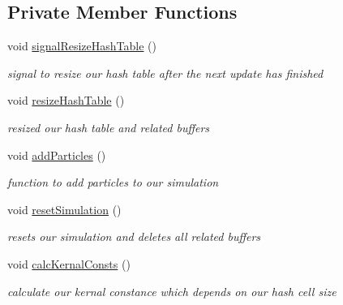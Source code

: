 \subsection*{Private Member Functions}
\begin{DoxyCompactItemize}
\item 
\hypertarget{class_s_p_h_engine_aee1d2a0c0bbc334c35924bc0a8ad8052}{void \hyperlink{class_s_p_h_engine_aee1d2a0c0bbc334c35924bc0a8ad8052}{signal\-Resize\-Hash\-Table} ()}\label{class_s_p_h_engine_aee1d2a0c0bbc334c35924bc0a8ad8052}

\begin{DoxyCompactList}\small\item\em signal to resize our hash table after the next update has finished \end{DoxyCompactList}\item 
\hypertarget{class_s_p_h_engine_a3626e4be502cdce3eb88bcdbf5adb2f6}{void \hyperlink{class_s_p_h_engine_a3626e4be502cdce3eb88bcdbf5adb2f6}{resize\-Hash\-Table} ()}\label{class_s_p_h_engine_a3626e4be502cdce3eb88bcdbf5adb2f6}

\begin{DoxyCompactList}\small\item\em resized our hash table and related buffers \end{DoxyCompactList}\item 
\hypertarget{class_s_p_h_engine_a8d1f44ed34bc68b564f7e5c730288d44}{void \hyperlink{class_s_p_h_engine_a8d1f44ed34bc68b564f7e5c730288d44}{add\-Particles} ()}\label{class_s_p_h_engine_a8d1f44ed34bc68b564f7e5c730288d44}

\begin{DoxyCompactList}\small\item\em function to add particles to our simulation \end{DoxyCompactList}\item 
\hypertarget{class_s_p_h_engine_a5e5a0bc3c47805756cd697a16076800d}{void \hyperlink{class_s_p_h_engine_a5e5a0bc3c47805756cd697a16076800d}{reset\-Simulation} ()}\label{class_s_p_h_engine_a5e5a0bc3c47805756cd697a16076800d}

\begin{DoxyCompactList}\small\item\em resets our simulation and deletes all related buffers \end{DoxyCompactList}\item 
void \hyperlink{class_s_p_h_engine_adaa52f452f1f804bb6a60dea821f2543}{calc\-Kernal\-Consts} ()
\begin{DoxyCompactList}\small\item\em calculate our kernal constance which depends on our hash cell size \end{DoxyCompactList}\end{DoxyCompactItemize}
